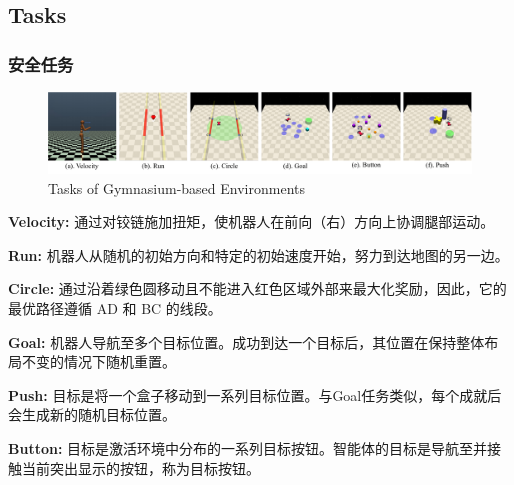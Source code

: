 \documentclass[10pt,mathserif]{beamer}%
\begin{document}
\subsection{Tasks}
\begin{frame}[t,fragile]
    \frametitle{安全任务}
\begin{figure}[ht]
  \centering
  \includegraphics[width=0.9\linewidth]{Safety-Gymnasium/assets/main-paper/tasks.pdf}
  \caption{Tasks of Gymnasium-based Environments}
  \label{pic:agent}
\end{figure}
\vspace{-0.5cm}
\begin{itemize}
{
\fontsize{8pt}{9.6pt}\selectfont
    \item \textbf{Velocity:} 通过对铰链施加扭矩，使机器人在前向（右）方向上协调腿部运动。
    \item \textbf{Run:} 机器人从随机的初始方向和特定的初始速度开始，努力到达地图的另一边。
    \item \textbf{Circle:} 通过沿着绿色圆移动且不能进入红色区域外部来最大化奖励，因此，它的最优路径遵循 AD 和 BC 的线段。
    \item \textbf{Goal:} 机器人导航至多个目标位置。成功到达一个目标后，其位置在保持整体布局不变的情况下随机重置。
    \item \textbf{Push:} 目标是将一个盒子移动到一系列目标位置。与Goal任务类似，每个成就后会生成新的随机目标位置。
    \item \textbf{Button:} 目标是激活环境中分布的一系列目标按钮。智能体的目标是导航至并接触当前突出显示的按钮，称为目标按钮。
}
\end{itemize}
\end{frame}
\end{document}
